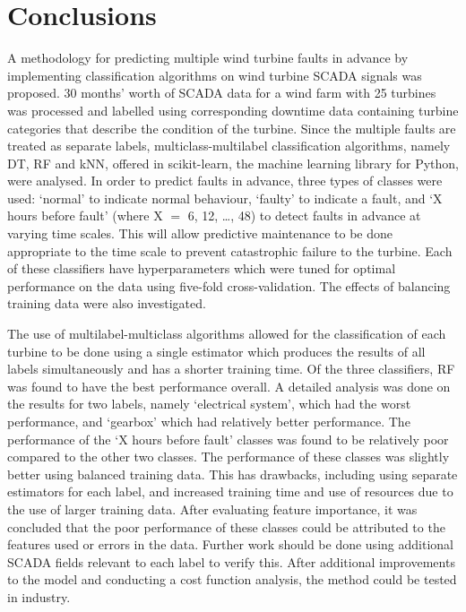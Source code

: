 \chapter{Conclusions}\label{c5}

A methodology for predicting multiple wind turbine faults in advance by
implementing classification algorithms on wind turbine SCADA signals was
proposed. 30 months' worth of SCADA data for a wind farm with 25 turbines was
processed and labelled using corresponding downtime data containing turbine
categories that describe the condition of the turbine. Since the multiple
faults are treated as separate labels, multiclass-multilabel classification
algorithms, namely DT, RF and kNN, offered in scikit-learn, the machine
learning library for Python, were analysed. In order to predict faults in
advance, three types of classes were used: `normal' to indicate normal
behaviour, `faulty' to indicate a fault, and `X hours before fault' (where X
\ensuremath{=} 6, 12, \dots, 48) to detect faults in advance at varying time scales.
This will allow predictive maintenance to be done appropriate to the time
scale to prevent catastrophic failure to the turbine. Each of these
classifiers have hyperparameters which were tuned for optimal performance on
the data using five-fold cross-validation. The effects of balancing training
data were also investigated.

The use of multilabel-multiclass algorithms allowed for the classification of
each turbine to be done using a single estimator which produces the results of
all labels simultaneously and has a shorter training time. Of the three
classifiers, RF was found to have the best performance overall. A detailed
analysis was done on the results for two labels, namely `electrical system',
which had the worst performance, and `gearbox' which had relatively better
performance. The performance of the `X hours before fault' classes was found
to be relatively poor compared to the other two classes. The performance of
these classes was slightly better using balanced training data. This has
drawbacks, including using separate estimators for each label, and increased
training time and use of resources due to the use of larger training data.
After evaluating feature importance, it was concluded that the poor
performance of these classes could be attributed to the features used or
errors in the data. Further work should be done using additional SCADA fields
relevant to each label to verify this. After additional improvements to the
model and conducting a cost function analysis, the method could be tested in
industry.
